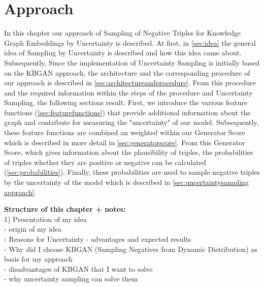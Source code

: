 \chapter{Approach}
\label{ch:approach}

In this chapter our approach of Sampling of Negative Triples for Knowledge Graph Embeddings by Uncertainty is described.
At first, in \autoref{sec:idea} the general idea of Sampling by Uncertainty is described and how this idea came about.
Subsequently, 
Since the implementation of Uncertainty Sampling is initially based on the \ac{KBGAN} approach, the architecture and the corresponding procedure of our approach is described in \autoref{sec:architectureandprocedure}.
From this procedure and the required information within the steps of the procedure and Uncertainty Sampling, the following sections result.
First, we introduce the various feature functions (\autoref{sec:featurefunctions}) that provide additional information about the graph and contribute for measuring the "uncertainty" of our model.
Subsequently, these feature functions are combined an weighted within our Generator Score which is described in more detail in \autoref{sec:generatorscore}.
From this Generator Score, which gives information about the plausibility of triples, the probabilities of triples whether they are positive or negative can be calculated (\autoref{sec:probabilities}). 
Finally, these probabilities are used to sample negative triples by the uncertainty of the model which is described in \autoref{sec:uncertaintysampling approach}.



\textbf{Structure of this chapter + notes:}\\

1) Presentation of my idea\\
- origin of my idea\\
- Reasons for Uncertainty - advantages and expected results\\
- Why did I choose KBGAN (Sampling Negatives from Dynamic Distribution) as basis for my approach\\
- disadvantages of KBGAN that I want to solve\\
- why uncertainty sampling can solve them\\

